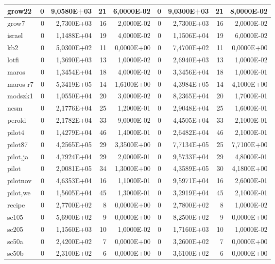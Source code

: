 \begin{tabular}{|l|r|r|r|r|r|r|r|r|}
grow22 & 0 & 9,0580E+03 & 21 & 6,0000E-02 & 0 & 9,0300E+03 & 21 & 8,0000E-02 \\ \hline
grow7 & 0 & 2,7300E+03 & 16 & 2,0000E-02 & 0 & 2,7300E+03 & 16 & 2,0000E-02 \\ \hline
israel & 0 & 1,1488E+04 & 19 & 4,0000E-02 & 0 & 1,1506E+04 & 19 & 6,0000E-02 \\ \hline
kb2 & 0 & 5,0300E+02 & 11 & 0,0000E+00 & 0 & 7,4700E+02 & 11 & 0,0000E+00 \\ \hline
lotfi & 0 & 1,3690E+03 & 13 & 1,0000E-02 & 0 & 2,6940E+03 & 13 & 1,0000E-02 \\ \hline
maros & 0 & 1,3454E+04 & 18 & 4,0000E-02 & 0 & 3,3456E+04 & 18 & 1,0000E-01 \\ \hline
maros-r7 & 0 & 5,3419E+05 & 14 & 1,6100E+00 & 0 & 4,3984E+05 & 14 & 4,1000E+00 \\ \hline
modszk1 & 0 & 1,0550E+04 & 20 & 3,0000E-02 & 0 & 8,2365E+04 & 20 & 1,7000E-01 \\ \hline
nesm & 0 & 2,1776E+04 & 25 & 1,2000E-01 & 0 & 2,9048E+04 & 25 & 1,6000E-01 \\ \hline
perold & 0 & 2,1782E+04 & 33 & 9,0000E-02 & 0 & 4,4505E+04 & 33 & 2,1000E-01 \\ \hline
pilot4 & 0 & 1,4279E+04 & 46 & 1,4000E-01 & 0 & 2,6482E+04 & 46 & 2,1000E-01 \\ \hline
pilot87 & 0 & 4,2565E+05 & 29 & 3,3500E+00 & 0 & 7,7134E+05 & 25 & 7,7100E+00 \\ \hline
pilot,ja & 0 & 4,7924E+04 & 29 & 2,0000E-01 & 0 & 9,5733E+04 & 29 & 4,8000E-01 \\ \hline
pilot & 0 & 2,0081E+05 & 34 & 1,3000E+00 & 0 & 4,3589E+05 & 30 & 4,1800E+00 \\ \hline
pilotnov & 0 & 4,6353E+04 & 16 & 1,1000E-01 & 0 & 9,5971E+04 & 16 & 2,6000E-01 \\ \hline
pilot,we & 0 & 1,5605E+04 & 45 & 1,3000E-01 & 0 & 3,2919E+04 & 45 & 2,1000E-01 \\ \hline
recipe & 0 & 2,7700E+02 & 8 & 0,0000E+00 & 0 & 2,7800E+02 & 8 & 1,0000E-02 \\ \hline
sc105 & 0 & 5,6900E+02 & 9 & 0,0000E+00 & 0 & 8,2500E+02 & 9 & 0,0000E+00 \\ \hline
sc205 & 0 & 1,1560E+03 & 10 & 1,0000E-02 & 0 & 1,7160E+03 & 10 & 1,0000E-02 \\ \hline
sc50a & 0 & 2,4200E+02 & 7 & 0,0000E+00 & 0 & 3,2600E+02 & 7 & 0,0000E+00 \\ \hline
sc50b & 0 & 2,3100E+02 & 6 & 0,0000E+00 & 0 & 3,6100E+02 & 6 & 0,0000E+00 \\ \hline

\end{tabular}
